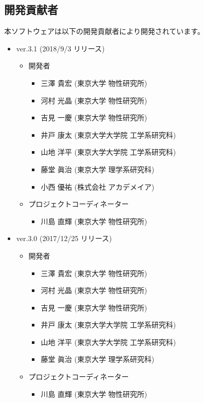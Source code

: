 \subsection{開発貢献者}
\label{subsec:developers}
本ソフトウェアは以下の開発貢献者により開発されています。
\begin{itemize}
\item{ver.3.1 (2018/9/3 リリース)}
\begin{itemize}
\item{開発者}
	\begin{itemize}
	\item{三澤 貴宏 (東京大学 物性研究所)}
	\item{河村 光晶 (東京大学 物性研究所)}
	\item{吉見 一慶 (東京大学 物性研究所)}
	\item{井戸 康太 (東京大学大学院 工学系研究科)}
	\item{山地 洋平 (東京大学大学院 工学系研究科)}
	\item{藤堂 眞治 (東京大学 理学系研究科)}
	\item{小西 優祐 (株式会社 アカデメイア)}
	\end{itemize}
\item{プロジェクトコーディネーター}
	\begin{itemize}
	\item{川島 直輝 (東京大学 物性研究所)}
	\end{itemize}
\end{itemize}

\item{ver.3.0 (2017/12/25 リリース)}
\begin{itemize}
\item{開発者}
	\begin{itemize}
	\item{三澤 貴宏 (東京大学 物性研究所)}
	\item{河村 光晶 (東京大学 物性研究所)}
	\item{吉見 一慶 (東京大学 物性研究所)}
	\item{井戸 康太 (東京大学大学院 工学系研究科)}
	\item{山地 洋平 (東京大学大学院 工学系研究科)}
	\item{藤堂 眞治 (東京大学 理学系研究科)}
	\end{itemize}
\item{プロジェクトコーディネーター}
	\begin{itemize}
	\item{川島 直輝 (東京大学 物性研究所)}
	\end{itemize}
\end{itemize}


\end{itemize}
